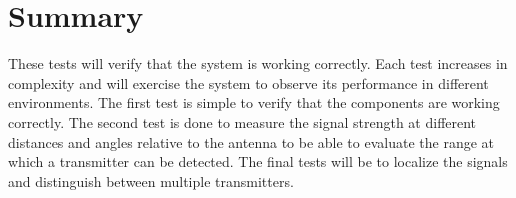 \section{Summary}
These tests will verify that the system is working correctly. Each test increases in complexity and will exercise the system to observe its performance in different environments. The first test is simple to verify that the components are working correctly. The second test is done to measure the signal strength at different distances and angles relative to the antenna to be able to evaluate the range at which a transmitter can be detected. The final tests will be to localize the signals and distinguish between multiple transmitters.
